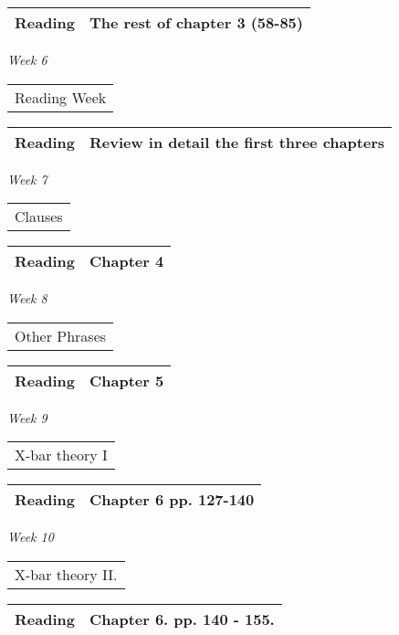 \documentclass[12pt]{article}
\begin{document}
\begin{flushright}
\begin{tabular}[t]{|l|p{2in}|}\hline \textbf{Reading} & The rest of chapter 3 (58-85) \\\hline \end{tabular}
\end{flushright}
\textit{Week 6} \dotfill \begin{tabular}[t]{l} Reading Week \end{tabular}
\begin{flushright}
\begin{tabular}[t]{|l|p{2in}|}\hline \textbf{Reading} & Review in detail the first three chapters \\\hline \end{tabular}
\end{flushright}
\textit{Week 7} \dotfill \begin{tabular}[t]{l} Clauses \end{tabular}
\begin{flushright}
\begin{tabular}[t]{|l|p{2in}|}\hline \textbf{Reading} & Chapter 4 \\ \hline \end{tabular}
\end{flushright}
\textit{Week 8} \dotfill \begin{tabular}[t]{l} Other Phrases \end{tabular}
\begin{flushright}
\begin{tabular}[t]{|l|p{2in}|}\hline \textbf{Reading} & Chapter 5 \\\hline \end{tabular}
\end{flushright}
\textit{Week 9} \dotfill \begin{tabular}[t]{l} X-bar theory I\\ \end{tabular}
\begin{flushright}
\begin{tabular}[t]{|l|p{2in}|}\hline \textbf{Reading} & Chapter 6 pp. 127-140 \\\hline \end{tabular}
\end{flushright}
\textit{Week 10} \dotfill \begin{tabular}[t]{l} X-bar theory II. \end{tabular}
\begin{flushright}
\begin{tabular}[t]{|l|p{2in}|}\hline \textbf{Reading} & Chapter 6.  pp. 140 - 155. \\\hline \end{tabular}
\end{flushright}
\end{document}

